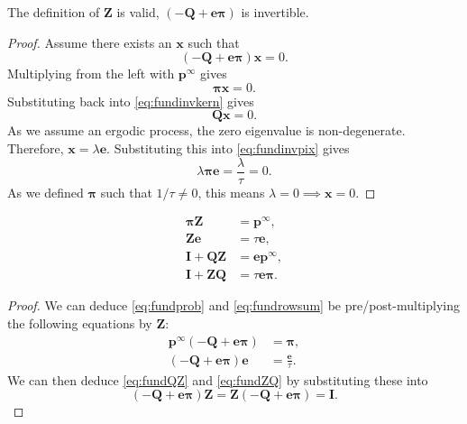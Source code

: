 \documentclass{article} %
\newcommand{\I}{\mathbf{I}}
\newcommand{\onev}{\mathbf{e}}
\newcommand{\MM}{\mathbf{Q}}
\newcommand{\pr}{\mathbf{p}}
\newcommand{\eq}{\pr^\infty}
\newcommand{\fund}{\mathbf{Z}}
\newcommand{\pib}{\boldsymbol{\pi}}
\begin{document}
\begin{thm}
  The definition of $\fund$ is valid, \ie $(-\MM + \onev\pib)$ is invertible.
\end{thm}
\begin{proof}
  Assume there exists an $\mathbf{x}$ such that
  \begin{equation}\label{eq:fundinvkern}
    (-\MM + \onev\pib)\mathbf{x}=0.
  \end{equation}
  Multiplying from the left with $\eq$ gives
  \begin{equation}\label{eq:fundinvpix}
    \pib \mathbf{x} = 0.
  \end{equation}
  Substituting back into \eqref{eq:fundinvkern} gives
  \begin{equation*}
    \MM\mathbf{x}=0.
  \end{equation*}
  As we assume an ergodic process, the zero eigenvalue is non-degenerate.
  Therefore, $\mathbf{x}=\lambda\onev$.
  Substituting this into \eqref{eq:fundinvpix} gives
  \begin{equation*}
    \lambda\pib\onev = \frac{\lambda}{\tau} = 0.
  \end{equation*}
  As we defined $\pib$ such that $1/\tau\neq0$, this means $\lambda=0 \implies \mathbf{x}=0$.
\end{proof}

\begin{cor}
  \begin{align}
    \pib\fund &= \eq, \label{eq:fundprob}\\
    \fund\onev &= \tau\onev,\label{eq:fundrowsum}\\
    \I+\MM\fund &= \onev\eq, \label{eq:fundQZ}\\
    \I+\fund\MM &= \tau\onev\pib. \label{eq:fundZQ}
  \end{align}
\end{cor}
\begin{proof}
  We can deduce \eqref{eq:fundprob} and \eqref{eq:fundrowsum} be pre/post-multiplying the following equations by $\fund$:
  \begin{equation*}
    \begin{aligned}
      \eq(-\MM + \onev\pib) &= \pib, \\
      (-\MM + \onev\pib)\onev &= \frac{\onev}{\tau}.
    \end{aligned}
  \end{equation*}
  We can then deduce \eqref{eq:fundQZ} and \eqref{eq:fundZQ} by substituting these into
  \begin{equation*}
    (-\MM + \onev\pib)\fund = \fund(-\MM + \onev\pib) = \I.
  \end{equation*}
\end{proof}
\end{document}
